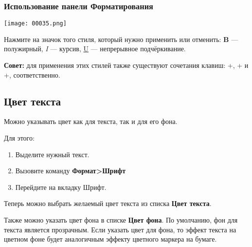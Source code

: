 ﻿\documentclass[a4paper,10pt]{article}
\begin{document}
\subsubsection{Использование панели Форматирования}

\texttt{[image: 00035.png]}

Нажмите на значок того стиля, который нужно применить или отменить: \textbf{B} — полужирный, \textit{I} — курсив, \underline{U} — непрерывное подчёркивание.

\begin{mdframed}[backgroundcolor=blue!10]
\textbf{Совет:} для применения этих стилей также существуют сочетания клавиш: +, + и +, соответственно.
\end{mdframed}

\subsection{Цвет текста}
Можно указывать цвет как для текста, так и для его фона.

Для этого:
\begin{enumerate}
 \item Выделите нужный текст.
 \item Вызовите команду \textbf{Формат>Шрифт}
 \item Перейдите на вкладку Шрифт.
\end{enumerate}

Теперь можно выбрать желаемый цвет текста из списка \textbf{Цвет текста}.

Также можно указать цвет фона в списке \textbf{Цвет фона}. По умолчанию, фон для текста является прозрачным. Если указать цвет для фона, то эффект текста на цветном фоне будет аналогичным эффекту цветного маркера на бумаге.
\end{document}

